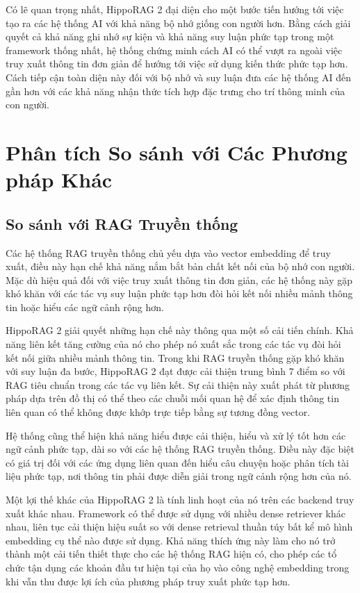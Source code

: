 \documentclass[../main.tex]{subfiles}
\begin{document}
Có lẽ quan trọng nhất, HippoRAG 2 đại diện cho một bước tiến hướng tới việc tạo ra các hệ thống AI với khả năng bộ nhớ giống con người hơn. Bằng cách giải quyết cả khả năng ghi nhớ sự kiện và khả năng suy luận phức tạp trong một framework thống nhất, hệ thống chứng minh cách AI có thể vượt ra ngoài việc truy xuất thông tin đơn giản để hướng tới việc sử dụng kiến thức phức tạp hơn. Cách tiếp cận toàn diện này đối với bộ nhớ và suy luận đưa các hệ thống AI đến gần hơn với các khả năng nhận thức tích hợp đặc trưng cho trí thông minh của con người.

\section{Phân tích So sánh với Các Phương pháp Khác}
\subsection{So sánh với RAG Truyền thống}
Các hệ thống RAG truyền thống chủ yếu dựa vào vector embedding để truy xuất, điều này hạn chế khả năng nắm bắt bản chất kết nối của bộ nhớ con người. Mặc dù hiệu quả đối với việc truy xuất thông tin đơn giản, các hệ thống này gặp khó khăn với các tác vụ suy luận phức tạp hơn đòi hỏi kết nối nhiều mảnh thông tin hoặc hiểu các ngữ cảnh rộng hơn.

HippoRAG 2 giải quyết những hạn chế này thông qua một số cải tiến chính. Khả năng liên kết tăng cường của nó cho phép nó xuất sắc trong các tác vụ đòi hỏi kết nối giữa nhiều mảnh thông tin. Trong khi RAG truyền thống gặp khó khăn với suy luận đa bước, HippoRAG 2 đạt được cải thiện trung bình 7 điểm so với RAG tiêu chuẩn trong các tác vụ liên kết. Sự cải thiện này xuất phát từ phương pháp dựa trên đồ thị có thể theo các chuỗi mối quan hệ để xác định thông tin liên quan có thể không được khớp trực tiếp bằng sự tương đồng vector.

Hệ thống cũng thể hiện khả năng hiểu được cải thiện, hiểu và xử lý tốt hơn các ngữ cảnh phức tạp, dài so với các hệ thống RAG truyền thống. Điều này đặc biệt có giá trị đối với các ứng dụng liên quan đến hiểu câu chuyện hoặc phân tích tài liệu phức tạp, nơi thông tin phải được diễn giải trong ngữ cảnh rộng hơn của nó.

Một lợi thế khác của HippoRAG 2 là tính linh hoạt của nó trên các backend truy xuất khác nhau. Framework có thể được sử dụng với nhiều dense retriever khác nhau, liên tục cải thiện hiệu suất so với dense retrieval thuần túy bất kể mô hình embedding cụ thể nào được sử dụng. Khả năng thích ứng này làm cho nó trở thành một cải tiến thiết thực cho các hệ thống RAG hiện có, cho phép các tổ chức tận dụng các khoản đầu tư hiện tại của họ vào công nghệ embedding trong khi vẫn thu được lợi ích của phương pháp truy xuất phức tạp hơn.
\end{document}
